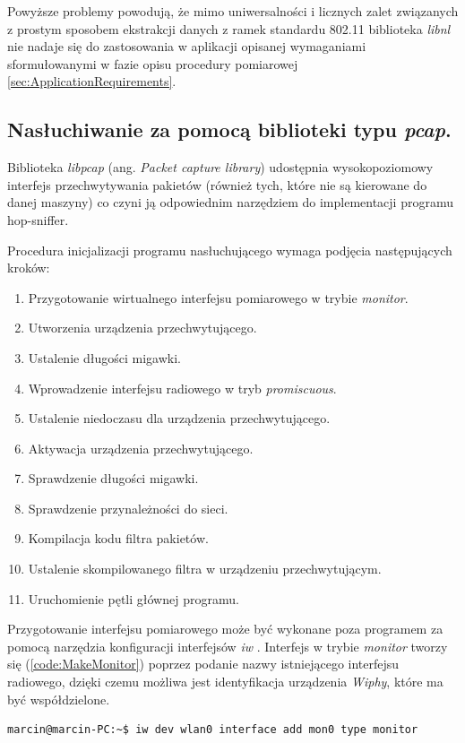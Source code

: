 Powyższe problemy powodują, że mimo uniwersalności i licznych zalet związanych z prostym sposobem ekstrakcji danych z ramek standardu 802.11 biblioteka \emph{libnl} nie nadaje się do zastosowania w aplikacji opisanej wymaganiami sformułowanymi w fazie opisu procedury pomiarowej \ref{sec:ApplicationRequirements}. 

\subsection{Nasłuchiwanie za pomocą biblioteki typu \emph{pcap}.}
\label{sec:LibPcap}

Biblioteka \emph{libpcap} (ang. \emph{Packet capture library}) udostępnia wysokopoziomowy interfejs przechwytywania pakietów (również tych, które nie są kierowane do danej maszyny) co czyni ją odpowiednim narzędziem do implementacji programu hop-sniffer. 

Procedura inicjalizacji programu nasłuchującego wymaga podjęcia następujących kroków:
\begin{enumerate}
\item Przygotowanie wirtualnego interfejsu pomiarowego w trybie \emph{monitor}.
\item Utworzenia urządzenia przechwytującego.
\item Ustalenie długości migawki.
\item Wprowadzenie interfejsu radiowego w tryb \emph{promiscuous}.
\item Ustalenie niedoczasu dla urządzenia przechwytującego.
\item Aktywacja urządzenia przechwytującego.
\item Sprawdzenie długości migawki.
\item Sprawdzenie przynależności do sieci.
\item Kompilacja kodu filtra pakietów.
\item Ustalenie skompilowanego filtra w urządzeniu przechwytującym.
\item Uruchomienie pętli głównej programu.
\end{enumerate}

Przygotowanie interfejsu pomiarowego może być wykonane poza programem za pomocą narzędzia konfiguracji interfejsów \emph{iw} \cite{www:IW}. Interfejs w trybie \emph{monitor} tworzy się (\ref{code:MakeMonitor}) poprzez podanie nazwy istniejącego interfejsu radiowego, dzięki czemu możliwa jest identyfikacja urządzenia \emph{Wiphy}, które ma być współdzielone. 

\begin{lstlisting}[frame=tb]
marcin@marcin-PC:~$ iw dev wlan0 interface add mon0 type monitor
\end{lstlisting}

